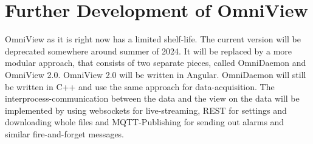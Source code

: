 \chapter[Further Devl]{Further Development of OmniView}
OmniView as it is right now has a limited shelf-life. 
The current version will be deprecated somewhere around summer of 2024.
It will be replaced by a more modular approach, that consists of two separate pieces, called OmniDaemon and OmniView 2.0.
OmniView 2.0 will be written in Angular.
OmniDaemon will still be written in C++ and use the same approach for data-acquisition. 
The interprocess-communication between the data and the view on the data will be implemented by using websockets for live-streaming, REST for settings and downloading whole files and MQTT-Publishing for sending out alarms and similar fire-and-forget messages. 
